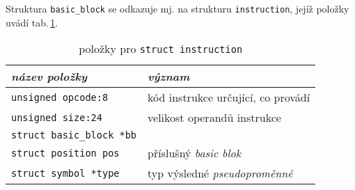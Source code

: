 Struktura \texttt{basic\_block} se odkazuje mj. na strukturu \texttt{instruction},
jejíž položky uvádí tab.\,\ref{tab:instruction}.

\begin{table}[!h]
    \begin{center}
        \begin{tabular}{|l|l|}
            \hline
            \textsl{název položky} & \textsl{význam} \\
            \hline
	            \texttt{unsigned opcode:8} & kód instrukce určující, co provádí\\
            	\texttt{unsigned size:24} & velikost operandů instrukce \\
                \texttt{struct basic\_block *bb} & \\
                \texttt{struct position pos} & příslušný \emph{basic blok}\\
                \texttt{struct symbol *type} & typ výsledné \emph{pseudoproměnné}\\
            \hline
        \end{tabular}
        \caption{položky pro \texttt{struct instruction}}
        \label{tab:instruction}
    \end{center}
\end{table}
